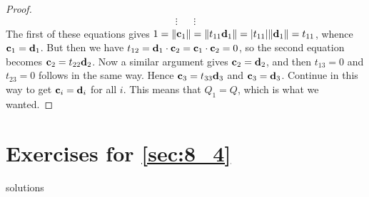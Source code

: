 \begin{proof}
\begin{equation*}
\begin{array}{ccl}
\vdots && \vdots
\end{array}
\end{equation*}
The first of these equations gives $1 = \| \textbf{c}_{1} \| = \| t_{11}\textbf{d}_{1} \| = | t_{11} | \| \textbf{d}_{1} \| = t_{11}$, whence $\textbf{c}_{1} = \textbf{d}_{1}$. But then we have $t_{12} = \textbf{d}_{1} \cdot \textbf{c}_{2} = \textbf{c}_{1} \cdot \textbf{c}_{2} = 0$, so the second equation becomes $\textbf{c}_{2} = t_{22}\textbf{d}_{2}$. Now a similar argument gives $\textbf{c}_{2} = \textbf{d}_{2}$, and then $t_{13} = 0$ and $t_{23} = 0$ follows in the same way. Hence $\textbf{c}_{3} = t_{33}\textbf{d}_{3}$ and $\textbf{c}_{3} = \textbf{d}_{3}$. Continue in this way to get $\textbf{c}_{i} = \textbf{d}_{i}$ for all $i$. This means that $Q_{1} = Q$, which is what we wanted.
\end{proof}

\section*{Exercises for \ref{sec:8_4}}

\begin{Filesave}{solutions}
\end{Filesave}

